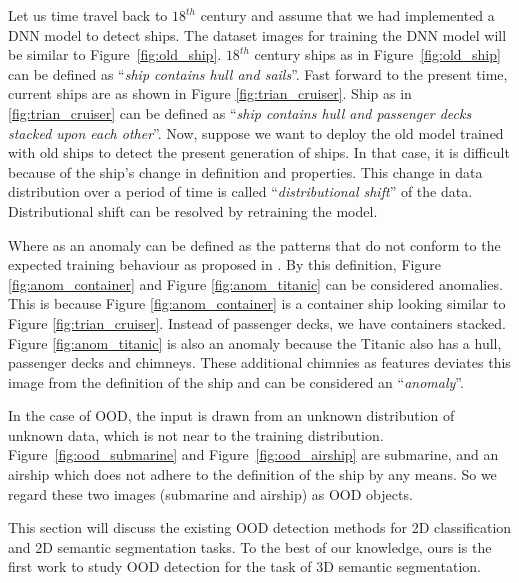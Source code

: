 Let us time travel back to $18^{th}$ century and assume that we had implemented a DNN model to detect ships.
The dataset images for training the DNN model will be similar to Figure~\ref{fig:old_ship}.
$18^{th}$ century ships as in Figure~\ref{fig:old_ship} can be defined as ``\textit{ship contains hull and sails}''.
Fast forward to the present time, current ships are as shown in Figure \ref{fig:trian_cruiser}.
Ship as in \ref{fig:trian_cruiser} can be defined as ``\textit{ship contains hull and passenger decks stacked upon each other}''.
Now, suppose we want to deploy the old model trained with old ships to detect
the present generation of ships. In that case, it is difficult because of the ship’s change in definition and properties.
This change in data distribution over a period of time is called ``\textit{distributional shift}'' of the data.
Distributional shift can be resolved by retraining the model.

Where as an anomaly can be defined as the patterns that do not conform to the expected training behaviour as proposed in  \cite{anomaly_sec1_1}.
By this definition, Figure \ref{fig:anom_container} and Figure \ref{fig:anom_titanic} can be considered anomalies.
This is because Figure \ref{fig:anom_container} is a container ship looking similar to Figure \ref{fig:trian_cruiser}. Instead of passenger decks, we have containers stacked.
Figure \ref{fig:anom_titanic} is also an anomaly because the Titanic also has a hull, passenger decks
and chimneys. These additional chimnies as features deviates this image from the definition of the ship
and can be considered an ``\textit{anomaly}''.

In the case of OOD, the input is drawn from an unknown distribution of unknown data, which is not near to the training distribution.
Figure~\ref{fig:ood_submarine} and Figure~\ref{fig:ood_airship} are submarine, and an airship which does not adhere to the definition of the ship by any means.
So we regard these two images (submarine and airship) as OOD objects.


    This section will discuss the existing OOD detection methods for 2D classification and 2D semantic segmentation tasks.
    To the best of our knowledge, ours is the first work to study OOD detection for the task of 3D semantic segmentation.

